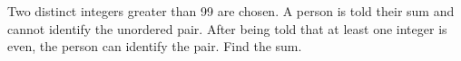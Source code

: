 Two distinct integers greater than 99 are chosen. A person is told their sum and cannot identify the unordered pair. After being told that at least one integer is even, the person can identify the pair. Find the sum.
